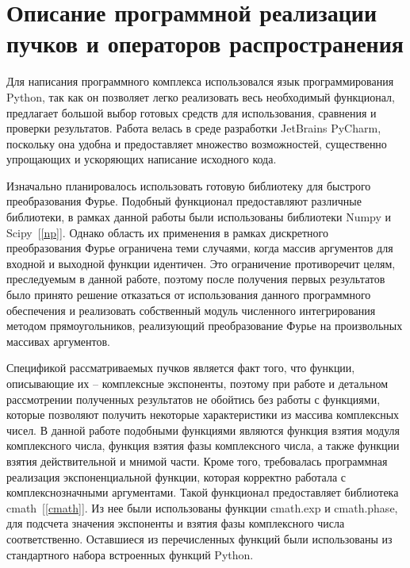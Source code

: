     \section[Описание программной реализации пучков и операторов распространения]{\nohyphens{Описание программной реализации пучков и операторов распространения}}
    {
    Для написания программного комплекса использовался язык
    программирования Python, так как он позволяет легко реализовать весь
    необходимый функционал, предлагает большой выбор готовых средств для
    использования, сравнения и проверки результатов. Работа велась в среде
    разработки JetBrains PyCharm, поскольку она удобна и предоставляет
    множество возможностей, существенно упрощающих и ускоряющих написание
    исходного кода.

    Изначально планировалось использовать готовую библиотеку для
    быстрого преобразования Фурье. Подобный функционал предоставляют
    различные библиотеки, в рамках данной работы были использованы
    библиотеки Numpy и Scipy~[\ref{np}]. Однако область их применения в рамках
    дискретного преобразования Фурье ограничена теми случаями, когда массив
    аргументов для входной и выходной функции идентичен.
    Это ограничение противоречит целям, преследуемым в данной работе, поэтому после получения
    первых результатов было принято решение отказаться от использования
    данного программного обеспечения и реализовать собственный модуль
    численного интегрирования методом прямоугольников, реализующий
    преобразование Фурье на произвольных массивах аргументов.

    Спецификой рассматриваемых пучков является факт того, что функции,
    описывающие их – комплексные экспоненты, поэтому при работе и детальном
    рассмотрении полученных результатов не обойтись без работы с функциями,
    которые позволяют получить некоторые характеристики из массива
    комплексных чисел. В данной работе подобными функциями являются
    функция взятия модуля комплексного числа, функция взятия фазы
    комплексного числа, а также функции взятия действительной и мнимой части.
    Кроме того, требовалась программная реализация экспоненциальной функции,
    которая корректно работала с комплекснозначными аргументами.
    Такой функционал предоставляет библиотека cmath~[\ref{cmath}]. Из нее были использованы
    функции cmath.exp и cmath.phase, для подсчета значения экспоненты и взятия
    фазы комплексного числа соответственно. Оставшиеся из перечисленных
    функций были использованы из стандартного набора встроенных функций
    Python.

}

